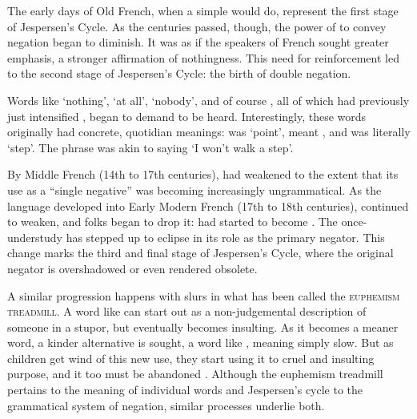 The early days of Old French, when a simple  would do, represent the first stage of Jespersen's Cycle. As the centuries passed, though, the power of  to convey negation began to diminish. It was as if the speakers of French sought greater emphasis, a stronger affirmation of nothingness. This need for reinforcement led to the second stage of Jespersen's Cycle: the birth of double negation.

Words like  `nothing',  `at all',  `nobody', and of course , all of which had previously just intensified , began to demand to be heard. Interestingly, these words originally had concrete, quotidian meanings:  was `point',  meant , and  was literally `step'. The phrase  was akin to saying `I won't walk a step'.

By Middle French (14th to 17th centuries),  had weakened to the extent that its use as a \enquote{single negative} was becoming increasingly ungrammatical. As the language developed into Early Modern French (17th to 18th centuries),  continued to weaken, and folks began to drop it:  had started to become . The once-understudy  has stepped up to eclipse  in its role as the primary negator. This change marks the third and final stage of Jespersen's Cycle, where the original negator is overshadowed or even rendered obsolete.

A similar progression happens with slurs in what has been called the \textsc{euphemism treadmill}. A word like  can start out as a non-judgemental description of someone in a stupor, but eventually becomes insulting. As it becomes a meaner word, a kinder alternative is sought, a word like , meaning simply slow. But as children get wind of this new use, they start using it to cruel and insulting purpose, and it too must be abandoned \citep{Taylor1974}. Although the euphemism treadmill pertains to the meaning of individual words and Jespersen's cycle to the grammatical system of negation, similar processes underlie both.

